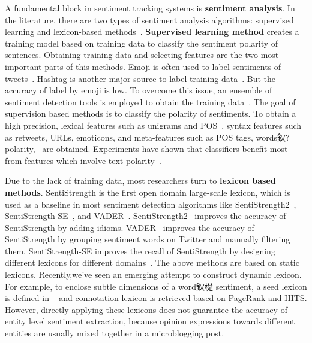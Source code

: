 \documentclass[runningheads]{llncs}
\begin{document}
A fundamental block in sentiment tracking systems is \textbf{sentiment analysis}. In the literature, there are two types of sentiment analysis algorithms: supervised learning and lexicon-based methods~\cite{Ahmed2017SentiCR}. \textbf{Supervised learning method} creates a training model based on training data
to classify the sentiment polarity of sentences. Obtaining training data and selecting features are the two most important parts of this methods. 
Emoji is often used to label sentiments of tweets~\cite{Go2009Supervisedlearning,Pak2010Supervisedlearning}. Hashtag is another major source to label training data~\cite{Papadopoulos2012SocialEvent}.
But the accuracy of label by emoji is low. To overcome this issue, an ensemble of sentiment detection tools is employed to obtain the training data~\cite{Barbosa2010Supervisedlearning}. 
The goal of supervision based methods is to classify the polarity of sentiments. To obtain a high precision, lexical features such as unigrams and POS~\cite{Go2009Supervisedlearning,Davidov2010Supervisedlearning}, syntax features such as retweets, URLs, emoticons, and meta-features such as POS tags, words鈥?polarity,~\cite{Barbosa2010Supervisedlearning} are obtained.
Experiments have shown that classifiers benefit most from features which involve text polarity~\cite{Agarwal2010Supervisedlearning}.

Due to the lack of training data, most researchers turn to \textbf{lexicon based methods}. 
SentiStrength is the first open domain large-scale lexicon, which is used as a baseline in most sentiment detection algorithms like SentiStrength2~\cite{Thelwall2012lexicon}, SentiStrength-SE~\cite{Rakibul2017SentiStrength-SE}, and VADER~\cite{Hutto2014SSimproved}. 
SentiStrength2~\cite{Thelwall2012lexicon} improves the accuracy of SentiStrength by adding idioms. 
VADER~\cite{Hutto2014SSimproved} improves the accuracy of SentiStrength by grouping sentiment words on Twitter and manually filtering them. 
SentiStrength-SE improves the recall of SentiStrength by designing different lexicons for different domains~\cite{Rakibul2017SentiStrength-SE}. 
The above methods are based on static lexicons.
Recently,we've seen an emerging attempt to construct dynamic lexicon. 
For example, to enclose subtle dimensions of a word鈥檚 sentiment, a seed lexicon is defined in ~\cite{Feng2011lexicon} and connotation lexicon is retrieved based on PageRank and HITS. 
However, directly applying these lexicons does not guarantee the accuracy of entity level sentiment extraction, because opinion expressions towards different entities are usually mixed together in a microblogging post. 
\end{document}
